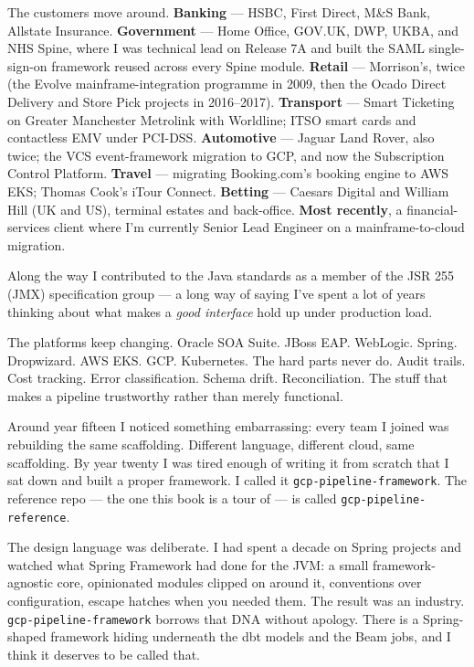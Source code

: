 \documentclass[
  11pt,
  british,
  oneside]{book}
\begin{document}
The customers move around. \textbf{Banking} --- HSBC, First Direct, M\&S
Bank, Allstate Insurance. \textbf{Government} --- Home Office, GOV.UK,
DWP, UKBA, and NHS Spine, where I was technical lead on Release 7A and
built the SAML single-sign-on framework reused across every Spine
module. \textbf{Retail} --- Morrison's, twice (the Evolve
mainframe-integration programme in 2009, then the Ocado Direct Delivery
and Store Pick projects in 2016--2017). \textbf{Transport} --- Smart
Ticketing on Greater Manchester Metrolink with Worldline; ITSO smart
cards and contactless EMV under PCI-DSS. \textbf{Automotive} --- Jaguar
Land Rover, also twice; the VCS event-framework migration to GCP, and
now the Subscription Control Platform. \textbf{Travel} --- migrating
Booking.com's booking engine to AWS EKS; Thomas Cook's iTour Connect.
\textbf{Betting} --- Caesars Digital and William Hill (UK and US),
terminal estates and back-office. \textbf{Most recently}, a
financial-services client where I'm currently Senior Lead Engineer on a
mainframe-to-cloud migration.

Along the way I contributed to the Java standards as a member of the JSR
255 (JMX) specification group --- a long way of saying
I've spent a lot of years thinking about what makes a \emph{good
interface} hold up under production load.

The platforms keep changing. Oracle SOA Suite. JBoss EAP. WebLogic.
Spring. Dropwizard. AWS EKS. GCP. Kubernetes. The hard parts never do.
Audit trails. Cost tracking. Error classification. Schema drift.
Reconciliation. The stuff that makes a pipeline trustworthy rather than
merely functional.

Around year fifteen I noticed something embarrassing: every team I
joined was rebuilding the same scaffolding. Different language,
different cloud, same scaffolding. By year twenty I was tired enough of
writing it from scratch that I sat down and built a proper framework. I
called it \texttt{gcp-pipeline-framework}. The reference repo --- the
one this book is a tour of --- is called
\texttt{gcp-pipeline-reference}.

The design language was deliberate. I had spent a decade on Spring
projects and watched what Spring Framework had done for the JVM: a small
framework-agnostic core, opinionated modules clipped on around it,
conventions over configuration, escape hatches when you needed them. The
result was an industry. \texttt{gcp-pipeline-framework} borrows that DNA
without apology. There is a Spring-shaped framework hiding underneath
the dbt models and the Beam jobs, and I think it deserves to be called
that.
\end{document}
